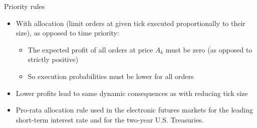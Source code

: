 \documentclass[english,10pt
,aspectratio=169
]{beamer}
\begin{document}
%	
%	
%
%


\begin{frame}{Priority rules}
	\begin{itemize}
		\item With  allocation (limit orders at given tick executed proportionally to their size), as opposed to \alert{time priority}:
		\begin{itemize}
			\item The expected profit of all orders at price $A_k$ must be zero (as opposed to strictly positive)
			\item So execution probabilities must be lower for all orders
		\end{itemize}
		\item Lower profits lead to same dynamic consequences as with reducing tick size
		\item Pro-rata allocation rule used in the electronic futures markets for the leading short-term interest rate and for the two-year U.S. Treasuries.
	\end{itemize}
\end{frame}
\end{document}
